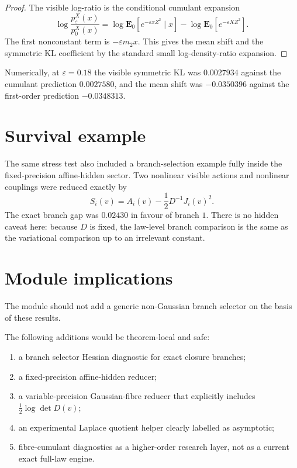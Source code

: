 \documentclass[11pt,a4paper]{article}
\numberwithin{equation}{section}
\newcommand{\E}{\mathbf E}
\theoremstyle{thmcompact}
\theoremstyle{remark}
\begin{document}
\begin{proof}
The visible log-ratio is the conditional cumulant expansion
\[
\log\frac{p_\varepsilon^X(x)}{p_0^X(x)}
=\log\E_0[e^{-\varepsilon xZ^2}\mid x]
-\log\E_0[e^{-\varepsilon XZ^2}].
\]
The first nonconstant term is $-\varepsilon m_2x$. This gives the mean shift and the symmetric KL coefficient by the standard small log-density-ratio expansion.
\end{proof}

Numerically, at $\varepsilon=0.18$ the visible symmetric KL was $0.0027934$ against the cumulant prediction $0.0027580$, and the mean shift was $-0.0350396$ against the first-order prediction $-0.0348313$.

\section{Survival example}

The same stress test also included a branch-selection example fully inside the fixed-precision affine-hidden sector. Two nonlinear visible actions and nonlinear couplings were reduced exactly by
\[
S_i(v)=A_i(v)-\frac12D^{-1}J_i(v)^2.
\]
The exact branch gap was $0.02430$ in favour of branch $1$. There is no hidden caveat here: because $D$ is fixed, the law-level branch comparison is the same as the variational comparison up to an irrelevant constant.

\section{Module implications}

The module should not add a generic non-Gaussian branch selector on the basis of these results.

The following additions would be theorem-local and safe:
\begin{enumerate}
\item a branch selector Hessian diagnostic for exact closure branches;
\item a fixed-precision affine-hidden reducer;
\item a variable-precision Gaussian-fibre reducer that explicitly includes $\frac12\log\det D(v)$;
\item an experimental Laplace quotient helper clearly labelled as asymptotic;
\item fibre-cumulant diagnostics as a higher-order research layer, not as a current exact full-law engine.
\end{enumerate}
\end{document}
